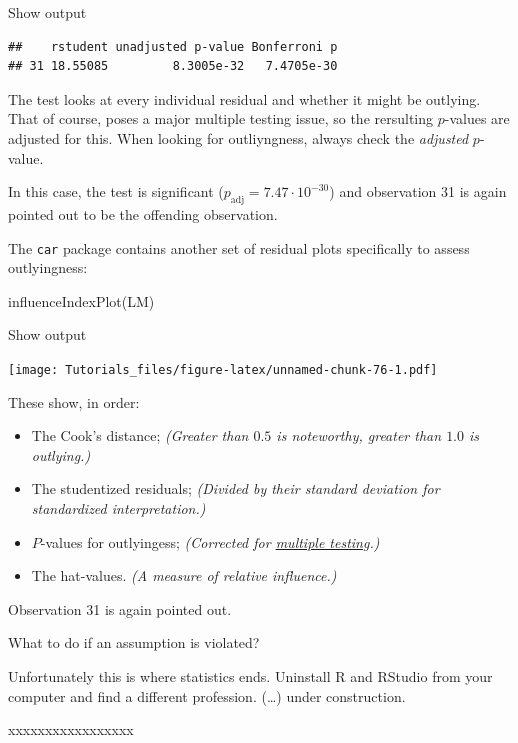 \documentclass[
]{book}
\newenvironment{Shaded}{\begin{snugshade}}{\end{snugshade}}
\newcommand{\FunctionTok}[1]{\textcolor[rgb]{0.00,0.00,0.00}{#1}}
\newcommand{\NormalTok}[1]{#1}
\providecommand{\tightlist}{%
  \setlength{\itemsep}{0pt}\setlength{\parskip}{0pt}}
\begin{document}
Show output

\begin{verbatim}
##    rstudent unadjusted p-value Bonferroni p
## 31 18.55085         8.3005e-32   7.4705e-30
\end{verbatim}

The test looks at every individual residual and whether it might be outlying. That of course, poses a major multiple testing issue, so the rersulting \(p\)-values are adjusted for this. When looking for outliyngness, always check the \emph{adjusted} \(p\)-value.

In this case, the test is significant (\(p_{\text{adj}} = 7.47 \cdot 10^{-30}\)) and observation 31 is again pointed out to be the offending observation.

The \texttt{car} package contains another set of residual plots specifically to assess outlyingness:

\begin{Shaded}
\begin{Highlighting}[]
\FunctionTok{influenceIndexPlot}\NormalTok{(LM)}
\end{Highlighting}
\end{Shaded}

Show output

\texttt{[image: Tutorials\_files/figure-latex/unnamed-chunk-76-1.pdf]}

These show, in order:

\begin{itemize}
\tightlist
\item
  The Cook's distance; \emph{(Greater than \(0.5\) is noteworthy, greater than \(1.0\) is outlying.)}
\item
  The studentized residuals; \emph{(Divided by their standard deviation for standardized interpretation.)}
\item
  \(P\)-values for outlyingess; \emph{(Corrected for \href{https://youtu.be/RUX94txw4Qo}{multiple testing}.)}
\item
  The hat-values. \emph{(A measure of relative influence.)}
\end{itemize}

Observation 31 is again pointed out.

What to do if an assumption is violated?

Unfortunately this is where statistics ends. Uninstall R and RStudio from your computer and find a different profession. (\ldots) under construction.

xxxxxxxxxxxxxxxxx
\end{document}
